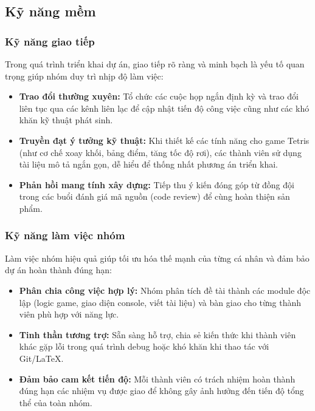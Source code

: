 \subsection{Kỹ năng mềm}

\subsubsection{Kỹ năng giao tiếp}
Trong quá trình triển khai dự án, giao tiếp rõ ràng và minh bạch là yếu tố quan trọng giúp nhóm duy trì nhịp độ làm việc:
\begin{itemize}
    \item \textbf{Trao đổi thường xuyên:} Tổ chức các cuộc họp ngắn định kỳ và trao đổi liên tục qua các kênh liên lạc để cập nhật tiến độ công việc cũng như các khó khăn kỹ thuật phát sinh.
    \item \textbf{Truyền đạt ý tưởng kỹ thuật:} Khi thiết kế các tính năng cho game Tetris (như cơ chế xoay khối, bảng điểm, tăng tốc độ rơi), các thành viên sử dụng tài liệu mô tả ngắn gọn, dễ hiểu để thống nhất phương án triển khai.
    \item \textbf{Phản hồi mang tính xây dựng:} Tiếp thu ý kiến đóng góp từ đồng đội trong các buổi đánh giá mã nguồn (code review) để cùng hoàn thiện sản phẩm.
\end{itemize}

\subsubsection{Kỹ năng làm việc nhóm}
Làm việc nhóm hiệu quả giúp tối ưu hóa thế mạnh của từng cá nhân và đảm bảo dự án hoàn thành đúng hạn:
\begin{itemize}
    \item \textbf{Phân chia công việc hợp lý:} Nhóm phân tích đề tài thành các module độc lập (logic game, giao diện console, viết tài liệu) và bàn giao cho từng thành viên phù hợp với năng lực.
    \item \textbf{Tinh thần tương trợ:} Sẵn sàng hỗ trợ, chia sẻ kiến thức khi thành viên khác gặp lỗi trong quá trình debug hoặc khó khăn khi thao tác với Git/LaTeX.
    \item \textbf{Đảm bảo cam kết tiến độ:} Mỗi thành viên có trách nhiệm hoàn thành đúng hạn các nhiệm vụ được giao để không gây ảnh hưởng đến tiến độ tổng thể của toàn nhóm.
\end{itemize}

